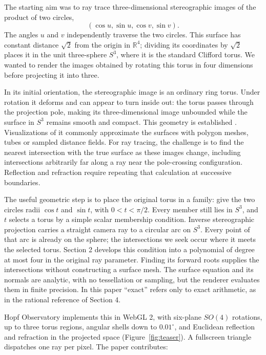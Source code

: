 \documentclass{jcgt}
\begin{document}
The starting aim was to ray trace three-dimensional stereographic images
of the product of two circles, \[
(\cos u,\sin u,\cos v,\sin v).
\] The angles \(u\) and \(v\) independently traverse the two circles.
This surface has constant distance \(\sqrt{2}\) from the origin in
\(\mathbb R^4\); dividing its coordinates by \(\sqrt{2}\) places it in
the unit three-sphere \(S^3\), where it is the standard Clifford torus.
We wanted to render the images obtained by rotating this torus in four
dimensions before projecting it into three.

In its initial orientation, the stereographic image is an ordinary ring
torus. Under rotation it deforms and can appear to turn inside out: the
torus passes through the projection pole, making its three-dimensional
image unbounded while the surface in \(S^3\) remains smooth and compact.
This geometry is established \citep{banchoff1990, mccuan1998}.
Visualizations of it commonly approximate the surfaces with polygon
meshes, tubes or sampled distance fields. For ray tracing, the challenge
is to find the nearest intersection with the true surface as these
images change, including intersections arbitrarily far along a ray near
the pole-crossing configuration. Reflection and refraction require
repeating that calculation at successive boundaries.

The useful geometric step is to place the original torus in a family:
give the two circles radii \(\cos t\) and \(\sin t\), with
\(0<t<\pi/2\). Every member still lies in \(S^3\), and \(t\) selects a
torus by a simple scalar membership condition. Inverse stereographic
projection carries a straight camera ray to a circular arc on \(S^3\).
Every point of that arc is already on the sphere; the intersections we
seek occur where it meets the selected torus. Section 2 develops this
condition into a polynomial of degree at most four in the original ray
parameter. Finding its forward roots supplies the intersections without
constructing a surface mesh. The surface equation and its normals are
analytic, with no tessellation or sampling, but the renderer evaluates
them in finite precision. In this paper ``exact'' refers only to exact
arithmetic, as in the rational reference of Section 4.

Hopf Observatory implements this in WebGL 2, with six-plane \(SO(4)\)
rotations, up to three torus regions, angular shells down to
\(0.01^\circ\), and Euclidean reflection and refraction in the projected
space (Figure~\ref{fig:teaser}). A fullscreen triangle dispatches one ray per pixel.
The paper contributes:
\end{document}
